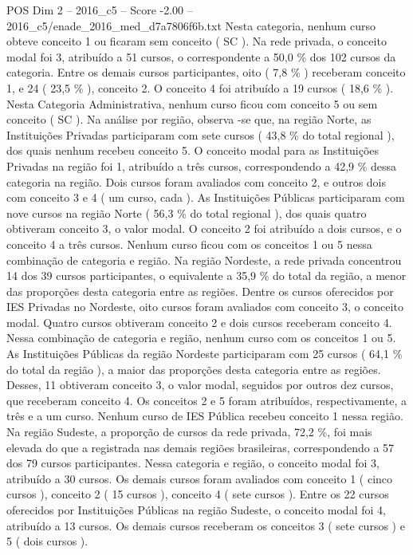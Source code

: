 \begin{textsample}{POS Dim 2 – 2016\_c5 – Score -2.00 – 2016\_c5/enade\_2016\_med\_d7a7806f6b.txt}
Nesta categoria, nenhum curso obteve conceito 1 ou ficaram sem conceito ( SC ).
Na rede privada, o conceito modal foi 3, atribuído a 51 cursos, o correspondente a 50,0 \% dos 102 cursos da categoria.
Entre os demais cursos participantes, oito ( 7,8 \% ) receberam conceito 1, e 24 ( 23,5 \% ), conceito 2.
O conceito 4 foi atribuído a 19 cursos ( 18,6 \% ).
Nesta Categoria Administrativa, nenhum curso ficou com conceito 5 ou sem conceito ( SC ).
Na análise por região, observa -se que, na região Norte, as Instituições Privadas participaram com sete cursos ( 43,8 \% do total regional ), dos quais nenhum recebeu conceito 5.
O conceito modal para as Instituições Privadas na região foi 1, atribuído a três cursos, correspondendo a 42,9 \% dessa categoria na região.
Dois cursos foram avaliados com conceito 2, e outros dois com conceito 3 e 4 ( um curso, cada ).
As Instituições Públicas participaram com nove cursos na região Norte ( 56,3 \% do total regional ), dos quais quatro obtiveram conceito 3, o valor modal.
O conceito 2 foi atribuído a dois cursos, e o conceito 4 a três cursos.
Nenhum curso ficou com os conceitos 1 ou 5 nessa combinação de categoria e região.
Na região Nordeste, a rede privada concentrou 14 dos 39 cursos participantes, o equivalente a 35,9 \% do total da região, a menor das proporções desta categoria entre as regiões.
Dentre os cursos oferecidos por IES Privadas no Nordeste, oito cursos foram avaliados com conceito 3, o conceito modal.
Quatro cursos obtiveram conceito 2 e dois cursos receberam conceito 4.
Nessa combinação de categoria e região, nenhum curso com os conceitos 1 ou 5.
As Instituições Públicas da região Nordeste participaram com 25 cursos ( 64,1 \% do total da região ), a maior das proporções desta categoria entre as regiões.
Desses, 11 obtiveram conceito 3, o valor modal, seguidos por outros dez cursos, que receberam conceito 4.
Os conceitos 2 e 5 foram atribuídos, respectivamente, a três e a um curso.
Nenhum curso de IES Pública recebeu conceito 1 nessa região.
Na região Sudeste, a proporção de cursos da rede privada, 72,2 \%, foi mais elevada do que a registrada nas demais regiões brasileiras, correspondendo a 57 dos 79 cursos participantes.
Nessa categoria e região, o conceito modal foi 3, atribuído a 30 cursos.
Os demais cursos foram avaliados com conceito 1 ( cinco cursos ), conceito 2 ( 15 cursos ), conceito 4 ( sete cursos ).
Entre os 22 cursos oferecidos por Instituições Públicas na região Sudeste, o conceito modal foi 4, atribuído a 13 cursos.
Os demais cursos receberam os conceitos 3 ( sete cursos ) e 5 ( dois cursos ).

\end{textsample}
